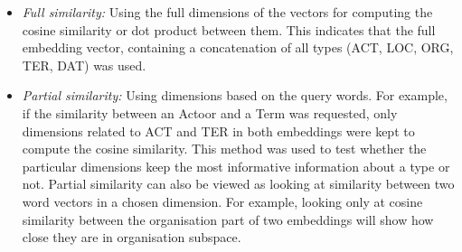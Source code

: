 \begin{itemize}
\item \emph{Full similarity:} Using the full dimensions of the vectors for computing the cosine similarity or dot product between them. This indicates that the full embedding vector, containing a concatenation of all types (ACT, LOC, ORG, TER, DAT) was used. 
\item \emph{Partial similarity:} Using dimensions based on the query words. For example, if the similarity between an Actoor and a Term was requested, only dimensions related to ACT and TER in both embeddings were kept to compute the cosine similarity. This method was used to test whether the particular dimensions keep the most informative information about a type or not. Partial similarity can also be viewed as looking at similarity between two word vectors in a chosen dimension. For example, looking only at cosine similarity between the organisation part of two embeddings will show how close they are in organisation subspace. 
\end{itemize}
